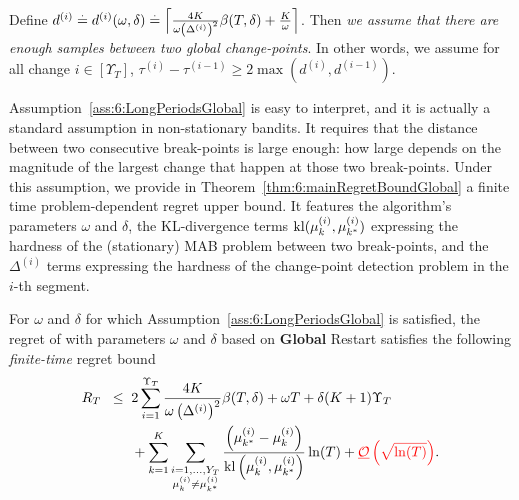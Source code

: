 \begin{assumption}\label{ass:6:LongPeriodsGlobal}
\begin{leftbar}[assumptionbar]  %
    Define
    $d^{(i)} \overset{.}{=} d^{(i)}(\omega,\delta) \overset{.}{=} \Bigl\lceil \frac{4K}{\omega\left(\Delta^{(i)}\right)^2}\beta(T,\delta) + \frac{K}{\omega} \Bigr\rceil$.
    Then \emph{we assume that there are enough samples between two global change-points}.
    In other words, we assume for all change $i \in [\Upsilon_T]$,
    $\tau^{(i)} - \tau^{(i-1)} \geq 2\max (d^{(i)},d^{(i-1)})$.
\end{leftbar}  %
\end{assumption}

Assumption~\ref{ass:6:LongPeriodsGlobal} is easy to interpret,
and it is actually a standard assumption in non-stationary bandits.
It requires that the distance between two consecutive break-points is large enough:
how large depends on the magnitude of the largest change that happen at those two break-points.
Under this assumption, we provide in Theorem~\ref{thm:6:mainRegretBoundGlobal} a finite time problem-dependent regret upper bound.
It features the algorithm's parameters $\omega$ and $\delta$,
the KL-divergence terms $\mathrm{kl}(\mu_k^{(i)},\mu_{k^*}^{(i)})$ expressing the hardness of the (stationary) MAB problem between two break-points,
and the $\Delta^{(i)}$ terms expressing the hardness of the change-point detection problem in the $i$-th segment.

\begin{theorem}\label{thm:6:mainRegretBoundGlobal}
\begin{leftbar}[theorembar]  %
    For $\omega$ and $\delta$ for which Assumption~\ref{ass:6:LongPeriodsGlobal} is satisfied, the regret of \GLRklUCB{} with parameters $\omega$ and $\delta$ based on \textbf{Global} Restart satisfies the following \emph{finite-time} regret bound
    \begin{align}
        R_T \;\; \leq \;\; & 2\sum_{i=1}^{\Upsilon_T} \frac{4K}{\omega \left(\Delta^{(i)}\right)^2}\beta(T,\delta) +\omega T + \delta (K+1)\Upsilon_T \\
        & + \sum_{k=1}^{K}\sum_{\substack{i = 1,\dots,Y_T\\\mu_k^{(i)} \neq \mu_{k^*}^{(i)}}} \frac{\left( \mu_{k^*}^{(i)}-\mu_k^{(i)}\right)}{\mathrm{kl}\left(\mu_k^{(i)},\mu_{k^*}^{(i)}\right)}\ln(T) + \textcolor{red}{\underline{\mathcal{O}}\left(\sqrt{\ln(T)}\right)}. \nonumber
    \end{align}
\end{leftbar}  %
\end{theorem}


